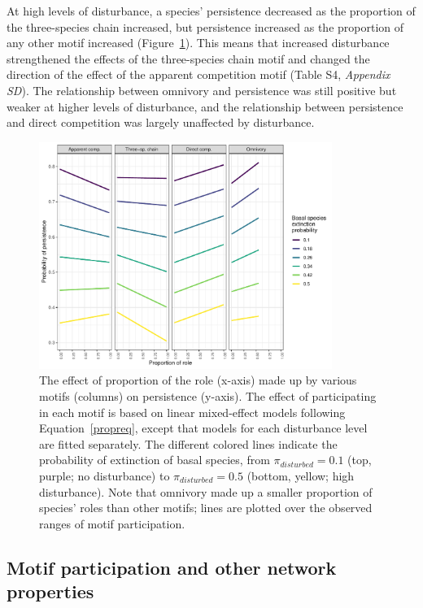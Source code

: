 \documentclass[12pt]{article}
\begin{document}
\begin{spacing}{2.0}
            
        At high levels of disturbance, a species' persistence decreased as the proportion of the three-species chain increased, but persistence increased as the proportion of any other motif increased (Figure~\ref{fig:prop_lmer_all}). 
        This means that increased disturbance strengthened the effects of the three-species chain motif and changed the direction of the effect of the apparent competition motif  (Table S4, \emph{Appendix SD}).
        The relationship between omnivory and persistence was still positive but weaker at higher levels of disturbance, and the relationship between persistence and direct competition was largely unaffected by disturbance.
    
            
            \begin{figure}[h!]
                \centering
                \includegraphics[width=0.85\textwidth]{figures/prop_lmer_allCS.pdf}
                \caption{The effect of proportion of the role (x-axis) made up by various motifs (columns) on persistence (y-axis). The effect of participating in each motif is based on linear mixed-effect models following Equation~\ref{propreq}, except that models for each  disturbance level are fitted separately. The different colored lines indicate the probability of extinction of basal species, from $\pi_{disturbed} = 0.1$ (top, purple; no disturbance) to $\pi_{disturbed} = 0.5$ (bottom, yellow; high disturbance). Note that omnivory made up a smaller proportion of species' roles than other motifs; lines are plotted over the observed ranges of motif participation.}
                \label{fig:prop_lmer_all}
            \end{figure}
        

    \subsection*{Motif participation and other network properties}


\end{spacing}
\end{document}
